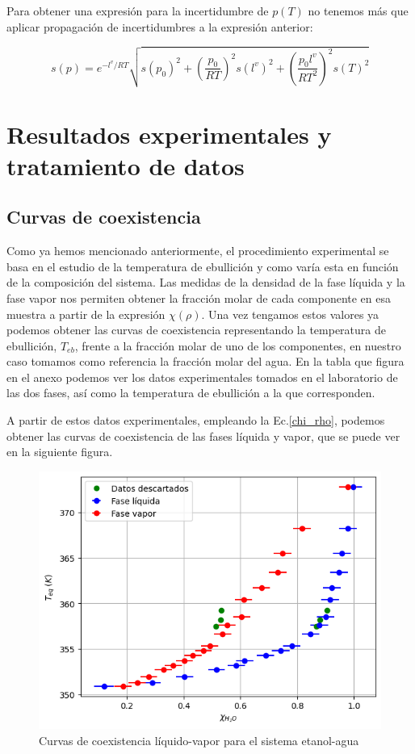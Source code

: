 \documentclass[a4paper,12pt,titlepage]{article}
\begin{document}
Para obtener una expresión para la incertidumbre de $p(T)$ no tenemos más que aplicar propagación de incertidumbres a la expresión anterior:

\begin{equation}
    s(p) = e^{-l^v/RT} \sqrt{s(p_0)^2 + \left( \frac{p_0}{RT} \right)^2 s(l^v)^2 + \left( \frac{p_0 l^v}{RT^2} \right)^2 s(T)^2}
\end{equation}


\section{Resultados experimentales y tratamiento de datos}

\subsection{Curvas de coexistencia}

Como ya hemos mencionado anteriormente, el procedimiento experimental se basa en el estudio de la temperatura de ebullición y como varía esta en función de la composición del sistema. Las medidas de la densidad de la fase líquida y la fase vapor nos permiten obtener la fracción molar de cada componente en esa muestra a partir de la expresión $\chi(\rho)$. Una vez tengamos estos valores ya podemos obtener las curvas de coexistencia representando la temperatura de ebullición, $T_{eb}$, frente a la fracción molar de uno de los componentes, en nuestro caso tomamos como referencia la fracción molar del agua. En la tabla que figura en el anexo podemos ver los datos experimentales tomados en el laboratorio de las dos fases, así como la temperatura de ebullición a la que corresponden.

A partir de estos datos experimentales, empleando la Ec.\ref{chi_rho}, podemos obtener las curvas de coexistencia de las fases líquida y vapor, que se puede ver en la siguiente figura.

\begin{figure}[h!]
    \centering
    \includegraphics[width=0.65\linewidth]{ELV binario/curva_descartes.png}
    \caption{Curvas de coexistencia líquido-vapor para el sistema etanol-agua}
    \label{fig:enter-label}
\end{figure}
\end{document}
